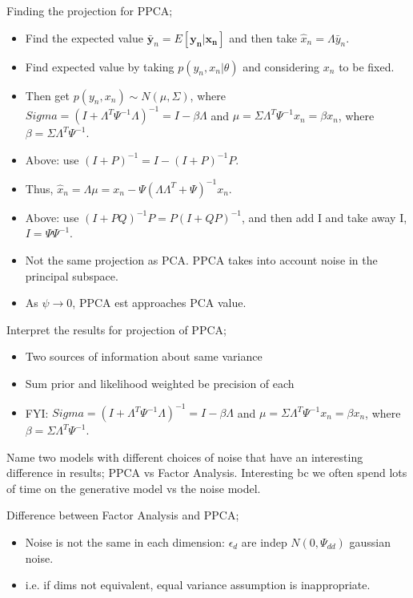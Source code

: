 \documentclass{article}
\begin{document}
Finding the projection for PPCA; \begin{itemize}
	\item Find the expected value $\mathbf{\bar{y}}_n=E[\mathbf{y_n|x_n}]$ and then take $\hat{x}_n=\Lambda\bar{y}_n$.
	\item Find expected value by taking $p(y_n, x_n|\theta)$ and considering $x_n$ to be fixed.
	\item Then get $p(y_n, x_n) \sim N(\mu, \Sigma)$, where $Sigma = (I+\Lambda^T\Psi^{-1}\Lambda)^{-1}=I-\beta\Lambda$ and $\mu=\Sigma\Lambda^T\Psi^{-1}x_n=\beta x_n$, where $\beta = \Sigma\Lambda^T\Psi^{-1}$.
	\item Above: use $(I+P)^{-1}=I-(I+P)^{-1}P$.
	\item Thus, $\hat{x}_n=\Lambda\mu=x_n - \Psi(\Lambda\Lambda^T+\Psi)^{-1}x_n$.
	\item Above: use $(I+PQ)^{-1}P=P(I+QP)^{-1}$, and then add I and take away I, $I=\Psi\Psi^{-1}$.
	\item Not the same projection as PCA. PPCA takes into account noise in the principal subspace.
	\item As $\psi\rightarrow 0$, PPCA est approaches PCA value.
\end{itemize}

Interpret the results for projection of PPCA; \begin{itemize}
	\item Two sources of information about same variance
	\item Sum prior and likelihood weighted be precision of each
	\item FYI: $Sigma = (I+\Lambda^T\Psi^{-1}\Lambda)^{-1}=I-\beta\Lambda$ and $\mu=\Sigma\Lambda^T\Psi^{-1}x_n=\beta x_n$, where $\beta = \Sigma\Lambda^T\Psi^{-1}$.	
\end{itemize}

Name two models with different choices of noise that have an interesting difference in results; PPCA vs Factor Analysis. \newline Interesting bc we often spend lots of time on the generative model vs the noise model.

Difference between Factor Analysis and PPCA; \begin{itemize}
	\item Noise is not the same in each dimension: $\epsilon_d$ are indep $N(0,\Psi_{dd})$ gaussian noise.
	\item i.e. if dims not equivalent, equal variance assumption is inappropriate.
\end{itemize}
\end{document}
